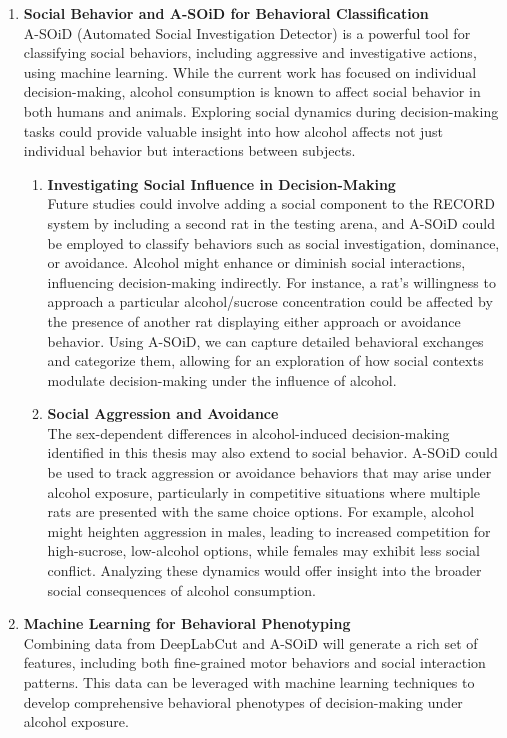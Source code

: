 \documentclass{article}
\begin{document}
\begin{enumerate}
    \item \textbf{Social Behavior and A-SOiD for Behavioral Classification}\\
    A-SOiD (Automated Social Investigation Detector) is a powerful tool for classifying social behaviors, including aggressive and investigative actions, using machine learning. While the current work has focused on individual decision-making, alcohol consumption is known to affect social behavior in both humans and animals. Exploring social dynamics during decision-making tasks could provide valuable insight into how alcohol affects not just individual behavior but interactions between subjects.

    \begin{enumerate}
        \item \textbf{Investigating Social Influence in Decision-Making}\\
        Future studies could involve adding a social component to the RECORD system by including a second rat in the testing arena, and A-SOiD could be employed to classify behaviors such as social investigation, dominance, or avoidance. Alcohol might enhance or diminish social interactions, influencing decision-making indirectly. For instance, a rat’s willingness to approach a particular alcohol/sucrose concentration could be affected by the presence of another rat displaying either approach or avoidance behavior. Using A-SOiD, we can capture detailed behavioral exchanges and categorize them, allowing for an exploration of how social contexts modulate decision-making under the influence of alcohol.

        \item \textbf{Social Aggression and Avoidance}\\
        The sex-dependent differences in alcohol-induced decision-making identified in this thesis may also extend to social behavior. A-SOiD could be used to track aggression or avoidance behaviors that may arise under alcohol exposure, particularly in competitive situations where multiple rats are presented with the same choice options. For example, alcohol might heighten aggression in males, leading to increased competition for high-sucrose, low-alcohol options, while females may exhibit less social conflict. Analyzing these dynamics would offer insight into the broader social consequences of alcohol consumption.

    \end{enumerate}

    \item \textbf{Machine Learning for Behavioral Phenotyping}\\
    Combining data from DeepLabCut and A-SOiD will generate a rich set of features, including both fine-grained motor behaviors and social interaction patterns. This data can be leveraged with machine learning techniques to develop comprehensive behavioral phenotypes of decision-making under alcohol exposure.
    

\end{enumerate}
\end{document}
